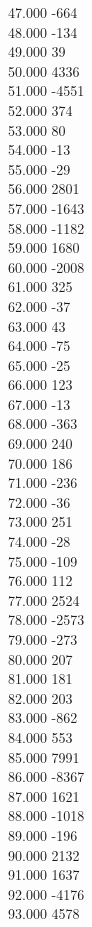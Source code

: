 { 47.000	-664 \\
 48.000	-134 \\
 49.000	39 \\
 50.000	4336 \\
 51.000	-4551 \\
 52.000	374 \\
 53.000	80 \\
 54.000	-13 \\
 55.000	-29 \\
 56.000	2801 \\
 57.000	-1643 \\
 58.000	-1182 \\
 59.000	1680 \\
 60.000	-2008 \\
 61.000	325 \\
 62.000	-37 \\
 63.000	43 \\
 64.000	-75 \\
 65.000	-25 \\
 66.000	123 \\
 67.000	-13 \\
 68.000	-363 \\
 69.000	240 \\
 70.000	186 \\
 71.000	-236 \\
 72.000	-36 \\
 73.000	251 \\
 74.000	-28 \\
 75.000	-109 \\
 76.000	112 \\
 77.000	2524 \\
 78.000	-2573 \\
 79.000	-273 \\
 80.000	207 \\
 81.000	181 \\
 82.000	203 \\
 83.000	-862 \\
 84.000	553 \\
 85.000	7991 \\
 86.000	-8367 \\
 87.000	1621 \\
 88.000	-1018 \\
 89.000	-196 \\
 90.000	2132 \\
 91.000	1637 \\
 92.000	-4176 \\
 93.000	4578 \\
}
